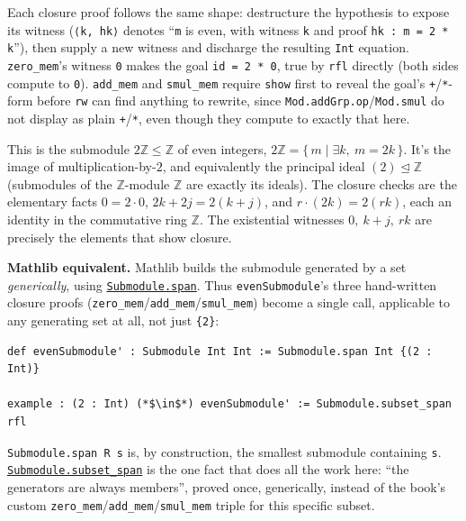 Each closure proof follows the same shape: destructure the hypothesis to expose its witness (\texttt{⟨k, hk⟩} denotes ``\texttt{m} is even, with witness \texttt{k} and proof \texttt{hk : m = 2 * k}''), then supply a new witness and discharge the resulting \texttt{Int} equation. \texttt{zero\_\allowbreak{}mem}'s witness \texttt{0} makes the goal \texttt{id = 2 * 0}, true by \texttt{rfl} directly (both sides compute to \texttt{0}). \texttt{add\_\allowbreak{}mem} and \texttt{smul\_\allowbreak{}mem} require \texttt{show} first to reveal the goal's \texttt{+}/\texttt{*}-form before \texttt{rw} can find anything to rewrite, since \texttt{Mod.addGrp.op}/\texttt{Mod.smul} do not display as plain \texttt{+}/\texttt{*}, even though they compute to exactly that here.

\begin{mathreading}

This is the submodule \(2\mathbb{Z} \le \mathbb{Z}\) of even integers, \(2\mathbb{Z} = \{\, m \mid \exists k,\ m = 2k \,\}\). It's the image of multiplication-by-\(2\), and equivalently the principal ideal \((2)\trianglelefteq \mathbb{Z}\) (submodules of the \(\mathbb{Z}\)-module \(\mathbb{Z}\) are exactly its ideals). The closure checks are the elementary facts \(0 = 2\cdot 0\), \(2k + 2j = 2(k+j)\), and \(r\cdot(2k) = 2(rk)\), each an identity in the commutative ring \(\mathbb{Z}\). The existential witnesses \(0,\ k+j,\ rk\) are precisely the elements that show closure.

\end{mathreading}

\textbf{Mathlib equivalent.} Mathlib builds the submodule generated by a set \emph{generically}, using \href{https://loogle.lean-lang.org/?q=Submodule.span}{\texttt{Submodule.span}}. Thus \texttt{evenSubmodule}'s three hand-written closure proofs (\texttt{zero\_\allowbreak{}mem}/\texttt{add\_\allowbreak{}mem}/\texttt{smul\_\allowbreak{}mem}) become a single call, applicable to any generating set at all, not just \texttt{\{2\}}:

\begin{lstlisting}
def evenSubmodule' : Submodule Int Int := Submodule.span Int {(2 : Int)}

example : (2 : Int) (*$\in$*) evenSubmodule' := Submodule.subset_span rfl
\end{lstlisting}

\texttt{Submodule.span R s} is, by construction, the smallest submodule containing \texttt{s}. \href{https://loogle.lean-lang.org/?q=Submodule.subset_span}{\texttt{Submodule.subset\_\allowbreak{}span}} is the one fact that does all the work here: ``the generators are always members'', proved once, generically, instead of the book's custom \texttt{zero\_\allowbreak{}mem}/\texttt{add\_\allowbreak{}mem}/\texttt{smul\_\allowbreak{}mem} triple for this specific subset.

